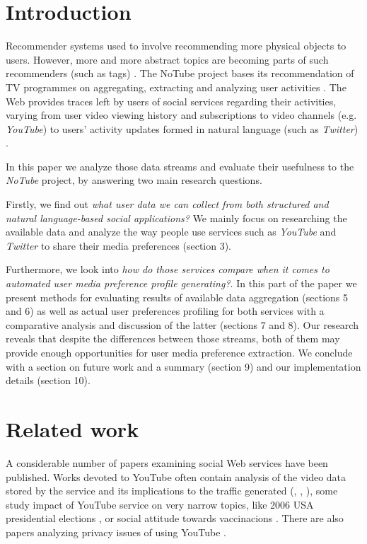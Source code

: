 \section{Introduction}

Recommender systems used to involve recommending more physical objects \cite{combining-cf-with-pa} to users.
However, more and more abstract topics are becoming parts of such recommenders (such as tags) \cite{accuracy-recommending}. The NoTube project bases its recommendation of TV programmes on aggregating,
extracting and analyzing user activities \cite{notube-main}. The Web provides traces left by users
of social services regarding their activities, varying from user video viewing history
and subscriptions to video channels (e.g. \textit{YouTube})
to users' activity updates formed in natural language (such as \textit{Twitter}) \cite{why-we-twitter}.

In this paper we analyze those data streams and evaluate their usefulness to the \textit{NoTube}
project, by answering two main research questions.

Firstly, we find out \textit{what user data we can collect from both structured and natural language-based social applications?} We mainly focus on researching the available data and analyze the way people use services such as
\textit{YouTube} and \textit{Twitter} to share their media preferences (section 3).

Furthermore, we look into \textit{how do those services compare when it comes to automated user media
preference profile generating?}. In this part of the paper we present methods for evaluating results of
available data aggregation (sections 5 and 6) as well as actual user preferences profiling for both
services with a comparative analysis and discussion of the latter (sections 7 and 8). Our research reveals that despite the
differences between those streams, both of them may provide enough opportunities for user media preference
extraction. We conclude with a section on future work and a summary (section 9) and our implementation details (section 10).

\section{Related work}

A considerable number of papers examining social Web services have been
published. Works devoted to YouTube often contain analysis of the video data
stored by the service and its implications to the traffic generated
(\cite{i-tube-you-tube}, \cite{views-from-the-edge},
\cite{statistics-and-social-network}), some study impact of YouTube service on
very narrow topics, like 2006 USA presidential elections
\cite{voters-myspace-youtube}, or social attitude towards vaccinacions
\cite{keelan}. There are also papers analyzing privacy issues of using YouTube
\cite{publicly-private}.

